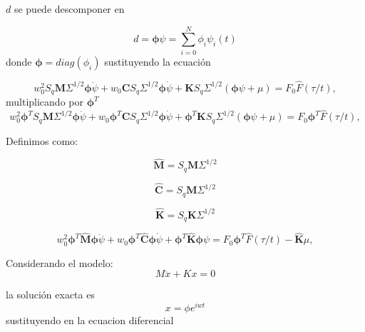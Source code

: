 $d$ se puede descomponer en

\[
d=\mathbf{\phi} \psi=\sum_{i=0}^{N}\phi_i \psi_i (t)
\]
donde $\mathbf{\phi} =diag(\phi_i)$ sustituyendo la ecuación

\[
w_0^2 S_q \mathbf M \Sigma^{1/2}\mathbf{\phi}\ddot \psi +w_0 \mathbf C  S_q \Sigma^{1/2}\mathbf{\phi} \dot\psi  +\mathbf K S_q \Sigma^{1/2} \left(\mathbf{\phi} \psi+\mu\right)=F_0 \hat{F}(\tau/t),
\]
multiplicando por $\mathbf{\phi}^T$
\[
w_0^2 \mathbf{\phi}^T S_q \mathbf M \Sigma^{1/2}\mathbf{\phi} \ddot\psi +w_0 \mathbf{\phi}^T \mathbf C  S_q \Sigma^{1/2}\mathbf{\phi} \dot\psi  +\mathbf{\phi}^T \mathbf K S_q \Sigma^{1/2} \left(\mathbf{\phi} \psi+\mu\right)=F_0 \mathbf{\phi}^T \hat{F}(\tau/t),
\]

Definimos como:

\[
\hat{\mathbf{M}}=S_q \mathbf M \Sigma^{1/2}
\]

\[
\hat{\mathbf{C}}=S_q \mathbf M \Sigma^{1/2}
\]

\[
\hat{\mathbf{K}}=S_q \mathbf K  \Sigma^{1/2}
\]

\[
w_0^2 \mathbf{\phi}^T \hat{\mathbf{M}} \mathbf{\phi} \ddot \psi + w_0 \mathbf{\phi}^T \hat{\mathbf{C}} \mathbf{\phi} \dot \psi  +\mathbf{\phi}^T \hat{\mathbf{K}} \mathbf{\phi} \psi=F_0 \mathbf{\phi}^T \hat{F}(\tau/t)-\hat{\mathbf{K}}\mu,
\]

Considerando el modelo:
\[
M \ddot{x}+K x=0
\]

la solución exacta es
\[
x=\phi e^{iwt}
\]
sustituyendo en la ecuacion diferencial

